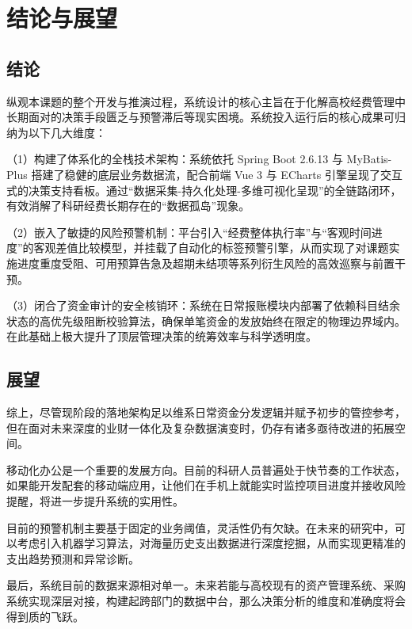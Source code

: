 \chapter{结论与展望}

\section{结论}
纵观本课题的整个开发与推演过程，系统设计的核心主旨在于化解高校经费管理中长期面对的决策手段匮乏与预警滞后等现实困境。系统投入运行后的核心成果可归纳为以下几大维度：

（1）构建了体系化的全栈技术架构：系统依托 Spring Boot 2.6.13 与 MyBatis-Plus 搭建了稳健的底层业务数据流，配合前端 Vue 3 与 ECharts 引擎呈现了交互式的决策支持看板。通过“数据采集-持久化处理-多维可视化呈现”的全链路闭环，有效消解了科研经费长期存在的“数据孤岛”现象。

（2）嵌入了敏捷的风险预警机制：平台引入“经费整体执行率”与“客观时间进度”的客观差值比较模型，并挂载了自动化的标签预警引擎，从而实现了对课题实施进度重度受阻、可用预算告急及超期未结项等系列衍生风险的高效巡察与前置干预。

（3）闭合了资金审计的安全核销环：系统在日常报账模块内部署了依赖科目结余状态的高优先级阻断校验算法，确保单笔资金的发放始终在限定的物理边界域内。在此基础上极大提升了顶层管理决策的统筹效率与科学透明度。

\section{展望}
综上，尽管现阶段的落地架构足以维系日常资金分发逻辑并赋予初步的管控参考，但在面对未来深度的业财一体化及复杂数据演变时，仍存有诸多亟待改进的拓展空间。

移动化办公是一个重要的发展方向。目前的科研人员普遍处于快节奏的工作状态，如果能开发配套的移动端应用，让他们在手机上就能实时监控项目进度并接收风险提醒，将进一步提升系统的实用性。

目前的预警机制主要基于固定的业务阈值，灵活性仍有欠缺。在未来的研究中，可以考虑引入机器学习算法，对海量历史支出数据进行深度挖掘，从而实现更精准的支出趋势预测和异常诊断。

最后，系统目前的数据来源相对单一。未来若能与高校现有的资产管理系统、采购系统实现深层对接，构建起跨部门的数据中台，那么决策分析的维度和准确度将会得到质的飞跃。
